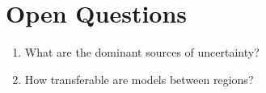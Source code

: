\section{Open Questions}

\begin{enumerate}
    \item What are the dominant sources of uncertainty?
    \item How transferable are models between regions?
\end{enumerate}